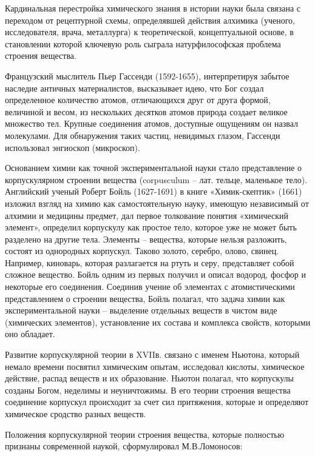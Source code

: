\documentclass[exam_answers.tex]{subfiles}
\begin{document}
\renewcommand{\baselinestretch}{\blch}

Кардинальная перестройка химического знания в истории науки была
связана с переходом от рецептурной схемы, определявшей действия алхимика
(ученого, исследователя, врача, металлурга) к теоретической, концептуальной
основе, в становлении которой ключевую роль сыграла натурфилософская
проблема строения вещества.

Французский мыслитель Пьер Гассенди (1592-1655), интерпретируя
забытое наследие античных материалистов, высказывает идею, что Бог создал
определенное количество атомов, отличающихся друг от друга формой,
величиной и весом, из нескольких десятков атомов природа создает великое
множество тел. Крупные соединения атомов, доступные ощущениям он назвал
молекулами. Для обнаружения таких частиц, невидимых глазом, Гассенди
использовал энгиоскоп (микроскоп).

Основанием химии как точной экспериментальной науки стало
представление о корпускулярном строении вещества (corpusculum – лат. тельце,
маленькое тело). Английский ученый Роберт Бойль (1627-1691) в книге
«Химик-скептик» (1661) изложил взгляд на химию как самостоятельную науку,
имеющую независимый от алхимии и медицины предмет, дал первое
толкование понятия «химический элемент», определил корпускулу как простое
тело, которое уже не может быть разделено на другие тела. Элементы –
вещества, которые нельзя разложить, состоят из однородных корпускул. Таково
золото, серебро, олово, свинец. Например, киноварь, которая разлагается на
ртуть и серу, представляет собой сложное вещество. Бойль одним из первых
получил и описал водород, фосфор и некоторые его соединения. Соединив
учение об элементах с атомистическими представлением о строении вещества,
Бойль полагал, что задача химии как экспериментальной науки – выделение
отдельных веществ в чистом виде (химических элементов), установление их
состава и комплекса свойств, которыми оно обладает.

Развитие корпускулярной теории в XVIIв. связано с именем Ньютона,
который немало времени посвятил химическим опытам, исследовал кислоты, 
химическое действие, распад веществ и их образование. Ньютон полагал, что
корпускулы созданы Богом, неделимы и неуничтожимы. В его теории строения
вещества соединение корпускул происходит за счет сил притяжения, которые и
определяют химическое сродство разных веществ.

Положения корпускулярной теории строения вещества, которые
полностью признаны современной наукой, сформулировал М.В.Ломоносов:
\end{document}
